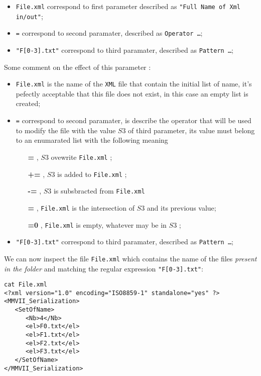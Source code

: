 \begin{itemize}
   \item  {\tt File.xml} correspond to first parameter described as {\tt "Full Name of Xml in/out"};
   \item  {\tt =} correspond to second paramater, described as {\tt  Operator \dots};
   \item  {\tt "F[0-3].txt"} correspond to third paramater, described as {\tt Pattern \dots};
\end{itemize}

Some comment on the effect of this parameter :
\begin{itemize}
   \item  {\tt File.xml} is the name of the {\tt XML} file  that contain the initial list of name, 
          it's pefectly acceptable that this file does not exist, in this case an empty list
          is created;

   \item  {\tt =} correspond to second paramater, is describe the operator that will be used to
          modify the file with the value $S3$ of third parameter,  its value must belong to an enumarated list with the following
          meaning
\begin{enumerate}
   \item[{\bf =}]  , $S3$ ovewrite    {\tt File.xml} ;
   \item[{\bf +=}] ,  $S3$ is added to {\tt File.xml} ;
   \item[{\bf -=}] , $S3$ is subsbracted from  {\tt File.xml}
   \item[{\bf *=}] , {\tt File.xml} is the intersection of $S3$ and its previous value;
   \item[{\bf =0}] , {\tt File.xml} is empty, whatever may be in  $S3$ ;
\end{enumerate}

   \item  {\tt "F[0-3].txt"} correspond to third paramater, described as {\tt Pattern \dots};
\end{itemize}


We can now inspect the file {\tt File.xml} which contains the name of the files
\emph{present in the folder} and matching the regular expression  {\tt "F[0-3].txt"}:

\begin{verbatim}
cat File.xml
<?xml version="1.0" encoding="ISO8859-1" standalone="yes" ?>
<MMVII_Serialization>
   <SetOfName>
      <Nb>4</Nb>
      <el>F0.txt</el>
      <el>F1.txt</el>
      <el>F2.txt</el>
      <el>F3.txt</el>
   </SetOfName>
</MMVII_Serialization>
\end{verbatim}


